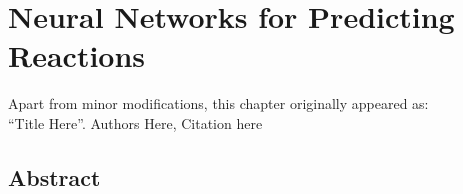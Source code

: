 \chapter{Neural Networks for Predicting Reactions}
\thispagestyle{plain}
\vspace{-.5cm}

\noindent Apart from minor modifications, this chapter originally appeared as:\newline\\
\ssp ``Title Here''.
Authors Here, Citation here

\section*{Abstract}
    \dsp
    


